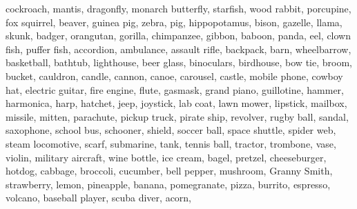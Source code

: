 \documentclass[10pt,twocolumn,letterpaper]{article}
\begin{document}
cockroach, \quad 
mantis, \quad 
dragonfly, \quad 
monarch butterfly, \quad 
starfish, \quad 
wood rabbit, \quad 
porcupine, \quad 
fox squirrel, \quad 
beaver, \quad 
guinea pig, \quad 
zebra, \quad 
pig, \quad 
hippopotamus, \quad 
bison, \quad 
gazelle, \quad 
llama, \quad 
skunk, \quad 
badger, \quad 
orangutan, \quad 
gorilla, \quad 
chimpanzee, \quad 
gibbon, \quad 
baboon, \quad 
panda, \quad 
eel, \quad 
clown fish, \quad 
puffer fish, \quad 
accordion, \quad 
ambulance, \quad 
assault rifle, \quad 
backpack, \quad 
barn, \quad 
wheelbarrow, \quad 
basketball, \quad 
bathtub, \quad 
lighthouse, \quad 
beer glass, \quad 
binoculars, \quad 
birdhouse, \quad 
bow tie, \quad 
broom, \quad 
bucket, \quad 
cauldron, \quad 
candle, \quad 
cannon, \quad 
canoe, \quad 
carousel, \quad 
castle, \quad 
mobile phone, \quad 
cowboy hat, \quad 
electric guitar, \quad 
fire engine, \quad 
flute, \quad 
gasmask, \quad 
grand piano, \quad 
guillotine, \quad 
hammer, \quad 
harmonica, \quad 
harp, \quad 
hatchet, \quad 
jeep, \quad 
joystick, \quad 
lab coat, \quad 
lawn mower, \quad 
lipstick, \quad 
mailbox, \quad 
missile, \quad 
mitten, \quad 
parachute, \quad 
pickup truck, \quad 
pirate ship, \quad 
revolver, \quad 
rugby ball, \quad 
sandal, \quad 
saxophone, \quad 
school bus, \quad 
schooner, \quad 
shield, \quad 
soccer ball, \quad 
space shuttle, \quad 
spider web, \quad 
steam locomotive, \quad 
scarf, \quad 
submarine, \quad 
tank, \quad 
tennis ball, \quad 
tractor, \quad 
trombone, \quad 
vase, \quad 
violin, \quad 
military aircraft, \quad 
wine bottle, \quad 
ice cream, \quad 
bagel, \quad 
pretzel, \quad 
cheeseburger, \quad 
hotdog, \quad 
cabbage, \quad 
broccoli, \quad 
cucumber, \quad 
bell pepper, \quad 
mushroom, \quad 
Granny Smith, \quad 
strawberry, \quad 
lemon, \quad 
pineapple, \quad 
banana, \quad 
pomegranate, \quad 
pizza, \quad 
burrito, \quad 
espresso, \quad 
volcano, \quad 
baseball player, \quad 
scuba diver, \quad 
acorn, \quad 
\end{document}
